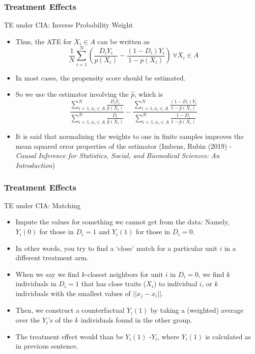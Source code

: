 \documentclass{beamer}
\begin{document}
\begin{frame}
\frametitle{Treatment Effects}
TE under CIA: Inverse Probability Weight
\begin{itemize}
\item Thus, the ATE for $X_i\in A$ can be written as
\[
\frac{1}{N}\sum_{i=1}^N\left(\frac{D_i Y_i}{p(X_i)}-\frac{(1-D_i)Y_i}{1-p(X_i)}\right) \ \forall X_i\in A
\]
\item In most cases, the propensity score should be estimated.
\item  So we use the estimator involving the $\hat{p}$, which is 
\[
\frac{\sum_{i=1,x_i\in A}^N\frac{D_iY_i}{\hat{p}(X_i)}}{\sum_{i=1,x_i\in A}^N\frac{D_i}{\hat{p}(X_i)}}-\frac{\sum_{i=1,x_i\in A}^N\frac{(1-D_i)Y_i}{1-\hat{p}(X_i)}}{\sum_{i=1,x_i\in A}^N\frac{1-D_i}{1-\hat{p}(X_i)}}\]
\item  It is said that normalizing the weights to one in finite samples improves the mean squared error properties of the estimator (Imbens, Rubin (2019) - \textit{Causal Inference for Statistics, Social, and Biomedical Sciences: An Introduction})
\end{itemize}
\end{frame}

\begin{frame}
\frametitle{Treatment Effects}
TE under CIA: Matching
\begin{itemize}
\item Impute the values for something we cannot get from the data: Namely,  $Y_i(0)$ for those in $D_i=1$ and $Y_i(1)$ for those in $D_i=0$. 
\item In other words, you try to find a `close' match for a particular unit $i$ in a different treatment arm. 
\item When we say we find $k$-closest neighbors for unit $i$ in $D_i=0$, we find $k$ individuals in $D_i=1$ that has close traits ($X_i$) to individual $i$, or $k$ individuals with the smallest values of $||x_j - x_i||$.
\item Then, we construct a counterfactual $Y_i(1)$ by taking a (weighted) average over the $Y_i$'s of the $k$ individuals found in the other group.
\item The treatment effect would than be $Y_i(1)$ -$Y_i$, where $Y_i(1)$ is calculated as in previous sentence. \par
\end{itemize}
\end{frame}
\end{document}
